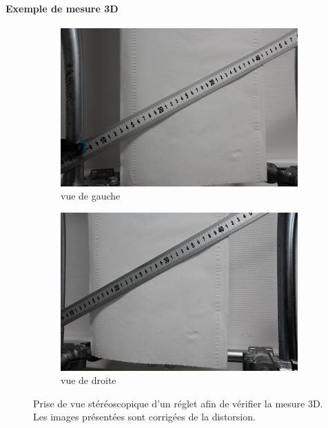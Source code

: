 \documentclass[a4paper, 11pt]{article}
\begin{document}
		\paragraph{Exemple de mesure 3D\\}
			\begin{figure}\centering
				\begin{subfigure}[c]{.48\linewidth}
					\includegraphics[width=\linewidth]{regletL_undistorted_small.jpg}
					\caption{vue de gauche}
				\end{subfigure}
				\begin{subfigure}[c]{.48\linewidth}
					\includegraphics[width=\linewidth]{regletR_undistorted_small.jpg}
					\caption{vue de droite}
				\end{subfigure}
				\caption{\label{fig:exemple_reconstruction_3D}Prise de vue stéréoscopique d'un réglet afin de vérifier la mesure 3D. Les images présentées sont corrigées de la distorsion.}
			\end{figure}
\end{document}
